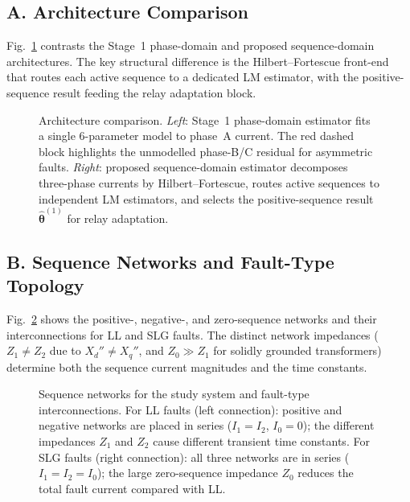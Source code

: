 \documentclass[10pt,journal,twoside]{IEEEtran}
\begin{document}
\subsection{A. Architecture Comparison}
\label{sec:results:arch}

Fig.~\ref{fig:arch} contrasts the Stage~1 phase-domain and proposed
sequence-domain architectures.  The key structural difference is the
Hilbert--Fortescue front-end that routes each active sequence to a
dedicated LM estimator, with the positive-sequence result feeding the
relay adaptation block.

\begin{figure}[!t]
\centering

\caption{Architecture comparison.  \textit{Left}: Stage~1 phase-domain
  estimator fits a single 6-parameter model to phase~A current.  The red
  dashed block highlights the unmodelled phase-B/C residual for asymmetric
  faults.  \textit{Right}: proposed sequence-domain estimator decomposes
  three-phase currents by Hilbert--Fortescue, routes active sequences to
  independent LM estimators, and selects the positive-sequence result
  $\hat{\bm\theta}^{(1)}$ for relay adaptation.}
\label{fig:arch}
\end{figure}

\subsection{B. Sequence Networks and Fault-Type Topology}
\label{sec:results:seqnet}

Fig.~\ref{fig:seqnet} shows the positive-, negative-, and zero-sequence
networks and their interconnections for LL and SLG faults.  The distinct
network impedances ($Z_1 \neq Z_2$ due to $X_d'' \neq X_q''$, and
$Z_0 \gg Z_1$ for solidly grounded transformers) determine both the
sequence current magnitudes and the time constants.

\begin{figure}[!t]
\centering

\caption{Sequence networks for the study system and fault-type
  interconnections.  For LL faults (left connection): positive and
  negative networks are placed in series ($I_1 = I_2$, $I_0 = 0$);
  the different impedances $Z_1$ and $Z_2$ cause different transient
  time constants.  For SLG faults (right connection): all three
  networks are in series ($I_1 = I_2 = I_0$); the large zero-sequence
  impedance $Z_0$ reduces the total fault current compared with LL.}
\label{fig:seqnet}
\end{figure}
\end{document}
